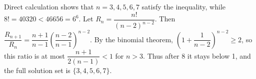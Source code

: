 Direct calculation shows that $n=3,4,5,6,7$ satisfy the inequality, while $8!=40320<46656=6^6$. Let $R_n=\dfrac{n!}{(n-2)^{n-2}}$. Then $\dfrac{R_{n+1}}{R_n}=\dfrac{n+1}{n-1}\left(\dfrac{n-2}{n-1}\right)^{n-2}$. By the binomial theorem, $(1+\dfrac{1}{n-2})^{n-2}\ge2$, so this ratio is at most $\dfrac{n+1}{2(n-1)}<1$ for $n>3$. Thus after 8 it stays below 1, and the full solution set is $\boxed{\{3,4,5,6,7\}}$.
